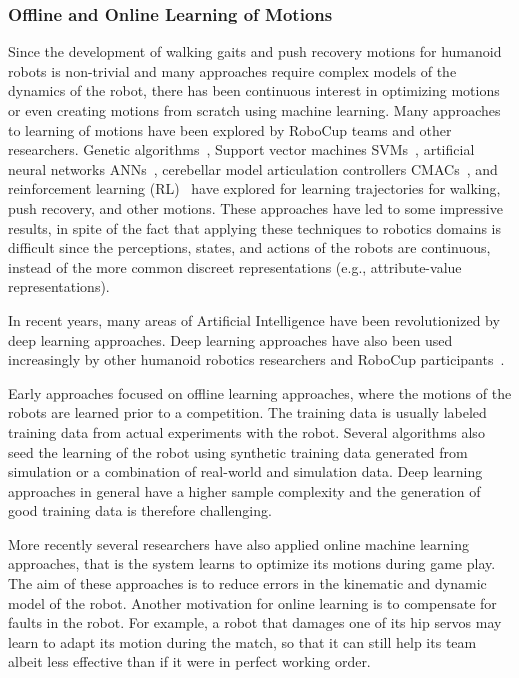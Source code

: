 \documentclass{article}
\begin{document}
\subsubsection{Offline and Online Learning of Motions}

Since the development of walking gaits and push recovery motions for humanoid robots is non-trivial and many approaches require complex models of the dynamics of the robot, there has been continuous interest in optimizing motions or even creating motions from scratch using machine learning.
Many approaches to learning of motions have been explored by RoboCup teams and other researchers.
Genetic algorithms~\cite{Huan2018}, Support vector machines SVMs~\cite{Wang2013}, artificial neural networks ANNs~\cite{Kim2012}, cerebellar model articulation controllers CMACs~\cite{Sabourin2005}, and reinforcement learning (RL)~\cite{Morimoto2004} have explored for learning trajectories for walking, push recovery, and other motions. 
These approaches have led to some impressive results, in spite of the fact that applying these techniques to robotics domains is difficult since the perceptions, states, and actions of the robots are continuous, instead of the more common discreet representations (e.g., attribute-value representations).

In recent years, many areas of Artificial Intelligence have been revolutionized by deep learning approaches.
Deep learning approaches have also been used increasingly by other humanoid robotics researchers and RoboCup participants~\cite{Hwangbo2019}.

Early approaches focused on offline learning approaches, where the motions of the robots are learned prior to a competition.
The training data is usually labeled training data from actual experiments with the robot.
Several algorithms also seed the learning of the robot using synthetic training data generated from simulation or a combination of real-world and simulation data.
Deep learning approaches in general have a higher sample complexity and the generation of good training data is therefore challenging.

More recently several researchers have also applied online machine learning approaches, that is the system learns to optimize its motions during game play.
The aim of these approaches is to reduce errors in the kinematic and dynamic model of the robot.
Another motivation for online learning is to compensate for faults in the robot. For example, a robot that damages one of its hip servos may learn to adapt its motion during the match, so that it can still help its team albeit less effective than if it were in perfect working order.
\end{document}
